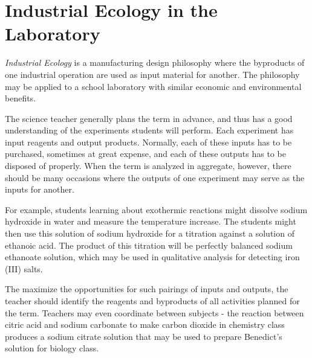 \chapter{Industrial Ecology in the Laboratory}

\textit{Industrial Ecology} is a manufacturing design philosophy 
where the byproducts of one industrial operation 
are used as input material for another. 
The philosophy may be applied to a school laboratory 
with similar economic and environmental benefits.

The science teacher generally plans the term in advance, 
and thus has a good understanding of the experiments students will perform. 
Each experiment has input reagents and output products. 
Normally, 
each of these inputs has to be purchased, 
sometimes at great expense, 
and each of these outputs has to be disposed of properly. 
When the term is analyzed in aggregate, 
however, 
there should be many occasions where the outputs of one experiment 
may serve as the inputs for another.

For example, 
students learning about exothermic reactions might 
dissolve sodium hydroxide in water and measure the temperature increase. 
The students might then use this solution 
of sodium hydroxide for a titration against a solution of ethanoic acid. 
The product of this titration will be 
perfectly balanced sodium ethanoate solution, 
which may be used in qualitative analysis for detecting iron (III) salts.

The maximize the opportunities for such pairings of inputs and outputs, 
the teacher should identify the reagents and byproducts of 
all activities planned for the term. 
Teachers may even coordinate between subjects - 
the reaction between citric acid and sodium carbonate 
to make carbon dioxide in chemistry class 
produces a sodium citrate solution that may be used 
to prepare Benedict's solution for biology class.
